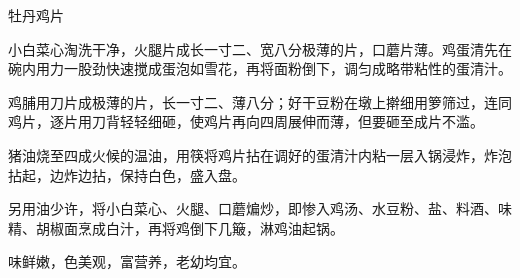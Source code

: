 \begin{recipe}{牡丹鸡片}

\ingredients


\preparation

\step 小白菜心淘洗干净，火腿片成长一寸二、宽八分极薄的片，口蘑片薄。鸡蛋清先在
碗内用力一股劲快速搅成蛋泡如雪花，再将面粉倒下，调匀成略带粘性的蛋清汁。

\step 鸡脯用刀片成极薄的片，长一寸二、薄八分；好干豆粉在墩上擀细用箩筛过，连同
鸡片，逐片用刀背轻轻细砸，使鸡片再向四周展伸而薄，但要砸至成片不滥。

\step 猪油烧至四成火候的温油，用筷将鸡片拈在调好的蛋清汁内粘一层入锅浸炸，炸泡
拈起，边炸边拈，保持白色，盛入盘。

\step 另用油少许，将小白菜心、火腿、口蘑煸炒，即惨入鸡汤、水豆粉、盐、料酒、味
精、胡椒面烹成白汁，再将鸡倒下几簸，淋鸡油起锅。

\features

味鲜嫩，色美观，富营养，老幼均宜。

\end{recipe}


